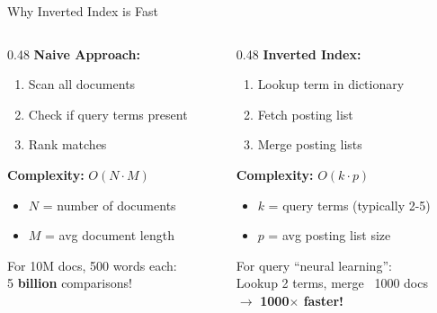 \documentclass[aspectratio=169]{beamer}
\newif\ifanimated
\newcommand{\cpause}{\ifanimated\pause\fi}
\begin{document}
\begin{frame}[shrink=10]{Why Inverted Index is Fast}
\begin{columns}
\begin{column}{0.48\textwidth}
\textbf{Naive Approach:}
\begin{enumerate}
    \item Scan all documents
    \item Check if query terms present
    \item Rank matches
\end{enumerate}
\cpause

\vspace{0.5em}

\textbf{Complexity:} $O(N \cdot M)$
\begin{itemize}
    \item $N$ = number of documents
    \item $M$ = avg document length
\end{itemize}

\vspace{0.5em}

For 10M docs, 500 words each: \\
5 \textbf{billion} comparisons!
\end{column}

\begin{column}{0.48\textwidth}
\textbf{Inverted Index:}
\begin{enumerate}
    \item Lookup term in dictionary
    \item Fetch posting list
    \item Merge posting lists
\end{enumerate}

\vspace{0.5em}

\textbf{Complexity:} $O(k \cdot p)$
\begin{itemize}
    \item $k$ = query terms (typically 2-5)
    \item $p$ = avg posting list size
\end{itemize}

\vspace{0.5em}

For query ``neural learning'': \\
Lookup 2 terms, merge ~1000 docs \\
$\rightarrow$ \textbf{1000$\times$ faster!}
\end{column}
\end{columns}
\end{frame}
\end{document}
